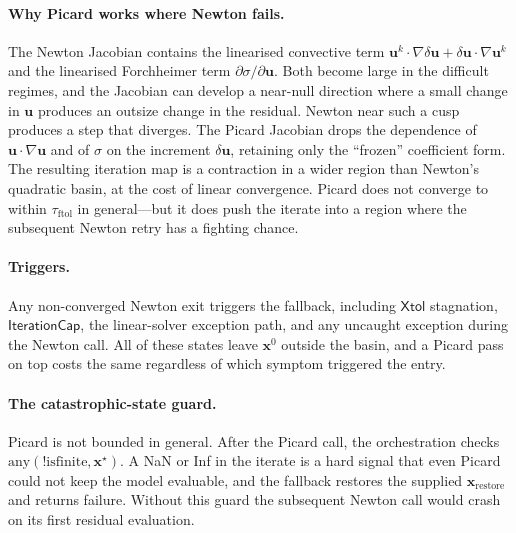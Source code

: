 \documentclass{article}
\newcommand{\textftol}{\tau_{\mathrm{ftol}}}
\begin{document}
\paragraph{Why Picard works where Newton fails.}  The Newton Jacobian
contains the linearised convective term
$\boldsymbol{u}^k \cdot \nabla \delta\boldsymbol{u} + \delta\boldsymbol{u} \cdot \nabla \boldsymbol{u}^k$
and the linearised Forchheimer term
$\partial\sigma/\partial\boldsymbol{u}$. Both become large in the
difficult regimes, and the Jacobian can develop a near-null direction
where a small change in $\boldsymbol{u}$ produces an outsize change in
the residual. Newton near such a cusp produces a step that diverges.
The Picard Jacobian drops the dependence of
$\boldsymbol{u}\cdot\nabla\boldsymbol{u}$ and of $\sigma$ on the
increment $\delta\boldsymbol{u}$, retaining only the ``frozen''
coefficient form. The resulting iteration map is a contraction in a
wider region than Newton's quadratic basin, at the cost of linear
convergence. Picard does not converge to within $\textftol$ in
general---but it does push the iterate into a region where the
subsequent Newton retry has a fighting chance.

\paragraph{Triggers.}  Any non-converged Newton exit triggers the
fallback, including $\mathsf{Xtol}$ stagnation, $\mathsf{IterationCap}$,
the linear-solver exception path, and any uncaught exception during
the Newton call. All of these states leave $\boldsymbol{x}^0$ outside
the basin, and a Picard pass on top costs the same regardless of which
symptom triggered the entry.

\paragraph{The catastrophic-state guard.}  Picard is not bounded in
general. After the Picard call, the orchestration checks
$\mathrm{any}(!\mathrm{isfinite}, \boldsymbol{x}^\star)$. A NaN or Inf
in the iterate is a hard signal that even Picard could not keep the
model evaluable, and the fallback restores the supplied
$\boldsymbol{x}_{\mathrm{restore}}$ and returns failure. Without this
guard the subsequent Newton call would crash on its first residual
evaluation.
\end{document}
